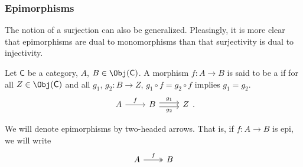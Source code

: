 \documentclass[notes.tex]{subfiles}
\begin{document}
\subsubsection{Epimorphisms}

The notion of a surjection can also be generalized. Pleasingly, it is more clear that epimorphisms are dual to monomorphisms than that surjectivity is dual to injectivity.

\begin{definition}[epimorphism]
  \label{def:epimorphism}
  Let $\mathsf{C}$ be a category, $A$, $B\in \Obj(\mathsf{C})$. A morphism $f\colon A \to B$ is said to be a  if for all $Z \in \Obj(\mathsf{C})$ and all $g_{1}$, $g_{2}\colon B \to Z$, $g_{1} \circ f = g_{2}\circ f$ implies $g_{1} = g_{2}$.
  \begin{equation*}
    \begin{tikzcd}
      A \arrow[r, "f"] & B \arrow[r, shift left, "g_{1}"] \arrow[r, shift right, swap, "g_{2}"] & Z
    \end{tikzcd}.
  \end{equation*}
\end{definition}

\begin{notation}
  We will denote epimorphisms by two-headed arrows. That is, if $f\colon A \to B$ is epi, we will write
  \begin{equation*}
    \begin{tikzcd}
      A
      \arrow[r, twoheadrightarrow, "f"]
      & B
    \end{tikzcd}
  \end{equation*}
\end{notation}
\end{document}
